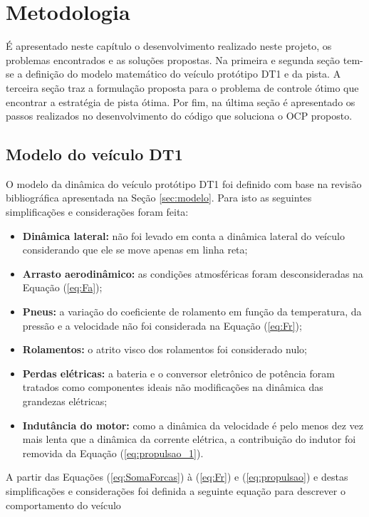 \chapter{Metodologia}
\label{chap:metodologia}
\thispagestyle{empty}

É apresentado neste capítulo o desenvolvimento realizado neste projeto, os problemas encontrados e as soluções propostas.
Na primeira e segunda seção tem-se a definição do modelo matemático do veículo protótipo DT1 e da pista. A terceira seção traz a formulação proposta para o problema de controle ótimo que encontrar
a estratégia de pista ótima. Por fim, na última  seção é apresentado os passos realizados no desenvolvimento do código que soluciona o OCP proposto. 

\section{Modelo do veículo DT1} 

O modelo da dinâmica do veículo protótipo DT1 foi definido com base na revisão bibliográfica apresentada na Seção \ref{sec:modelo}. 
Para isto as seguintes simplificações e considerações foram feita:

\begin{itemize}
    \item \textbf{Dinâmica lateral:} não foi levado em conta a dinâmica lateral do veículo considerando que ele se move apenas em linha reta; 
    \item \textbf{Arrasto aerodinâmico:} as condições atmosféricas foram desconsideradas na Equação (\ref{eq:Fa});
    \item \textbf{Pneus:} a variação do coeficiente de rolamento em função da temperatura, da pressão e a velocidade não foi considerada na Equação (\ref{eq:Fr});
    \item \textbf{Rolamentos:} o atrito visco dos rolamentos foi considerado nulo;
    \item \textbf{Perdas elétricas:} a bateria e o conversor eletrônico de potência foram tratados como componentes ideais não modificações na dinâmica das grandezas elétricas;
    \item \textbf{Indutância do motor:} como a dinâmica da velocidade é pelo menos dez vez mais lenta que a dinâmica da corrente elétrica, a contribuição do  indutor foi removida da Equação (\ref{eq:propulsao_1}).  
\end{itemize}

A partir das Equações (\ref{eq:SomaForcas}) à (\ref{eq:Fr}) e (\ref{eq:propulsao}) e destas simplificações e considerações foi definida a 
seguinte equação para descrever o comportamento do veículo

